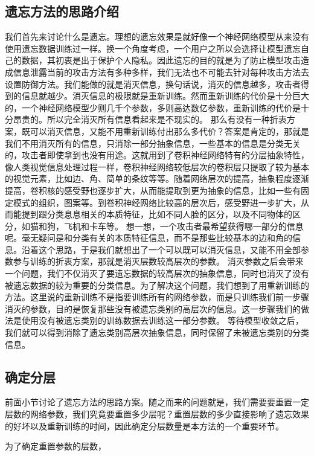 \subsection{遗忘方法的思路介绍}
我们首先来讨论什么是遗忘。理想的遗忘效果是就好像一个神经网络模型从来没有使用遗忘数据训练过一样。换一个角度考虑，一个用户之所以会选择让模型遗忘自己的数据，其初衷是出于保护个人隐私。因此遗忘的目的就是为了防止模型攻击造成信息泄露当前的攻击方法有多种多样，我们无法也不可能去针对每种攻击方法去设置防御方法。我们能做的就是消灭信息，换句话说，消灭的信息越多，攻击者得到的信息就越少。消灭信息的极限就是重新训练。然而重新训练的代价是十分巨大的，一个神经网络模型少则几千个参数，多则高达数亿参数，重新训练的代价是十分昂贵的。所以完全消灭所有信息看起来是不现实的。
那么有没有一种折衷方案，既可以消灭信息，又能不用重新训练付出那么多代价？答案是肯定的，那就是我们不用消灭所有的信息，只消除一部分抽象信息，一些基本的信息是分类无关的，攻击者即使拿到也没有用途。这就用到了卷积神经网络特有的分层抽象特性，像人类视觉信息处理过程一样，卷积神经网络较低层次的卷积层只提取了较为基本的视觉元素，比如边、角、简单的条纹等等。随着网络层次的提高，抽象程度逐渐提高，卷积核的感受野也逐步扩大，从而能提取到更为抽象的信息，比如一些有固定模式的组织，图案等。到卷积神经网络比较高的层次后，感受野进一步扩大，从而能提到跟分类息息相关的本质特征，比如不同人脸的区分，以及不同物体的区分，如猫和狗，飞机和卡车等。
想一想，一个攻击者最希望获得哪一部分的信息呢。毫无疑问是和分类有关的本质特征信息，而不是那些比较基本的边和角的信息。沿着这个思路，于是我们就想出了一个可以既可以消灭信息，又能不用全部参数参与训练的折衷方案，那就是消灭层数较高层次的参数。
消灭参数之后会带来一个问题，我们不仅消灭了要遗忘数据的较高层次的抽象信息，同时也消灭了没有被遗忘数据的较为重要的分类信息。为了解决这个问题，我们想到了用重新训练的方法。这里说的重新训练不是指要训练所有的网络参数，而是只训练我们前一步骤消灭的参数，目的是恢复那些没有被遗忘类别的高层次的信息。这一步骤我们的做法是使用没有被遗忘类别的训练数据去训练这一部分参数。
等待模型收敛之后，我们就可以得到消除了遗忘类别高层次抽象信息，同时保留了未被遗忘类别的分类信息。

\subsection{确定分层}

前面小节讨论了遗忘方法的思路方案。随之而来的问题就是，我们需要要重置一定层数的网络参数，我们究竟要重置多少层呢？重置层数的多少直接影响了遗忘效果的好坏以及重新训练的时间，因此确定分层数量是本方法的一个重要环节。

为了确定重置参数的层数，


